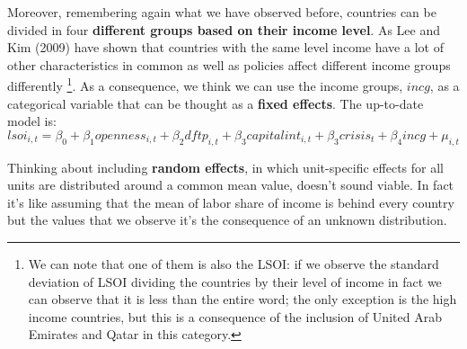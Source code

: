 \documentclass[12pt, letterpaper]{article}
\numberwithin{table}{section}   %
\begin{document}
Moreover, remembering again what we have observed before, countries can be divided in four \textbf{different groups based on their income level}. As Lee and Kim (2009) have shown that countries with the same level income have a lot of other  characteristics in common as well as policies affect different income groups differently \footnote{We can note that one of them is also the LSOI: if we observe the standard deviation of LSOI dividing the countries by their level of income in fact we can observe that it is less than the entire word; the only exception is the high income countries, but this is a consequence of the inclusion of United Arab Emirates and Qatar in this category.}. As a consequence, we think we can use the income groups, $incg$, as a categorical variable that can be thought as a \textbf{fixed effects}. The up-to-date model is:
\begin{equation*}
    lsoi_{i,t} = \beta_0 + \beta_1 openness_{i,t} +\beta_2 dftp_{i,t} + \beta_3 capitalint_{i,t}  + \beta_3crisis_t + \beta_4incg+ \mu_{i,t}
\end{equation*}

Thinking about including \textbf{random effects}, in which unit-specific effects for all units are distributed around a common mean value, doesn't sound viable. In fact it's like assuming that the mean of labor share of income is behind every country but the values that we observe it's the consequence of an unknown distribution. 


\end{document}
